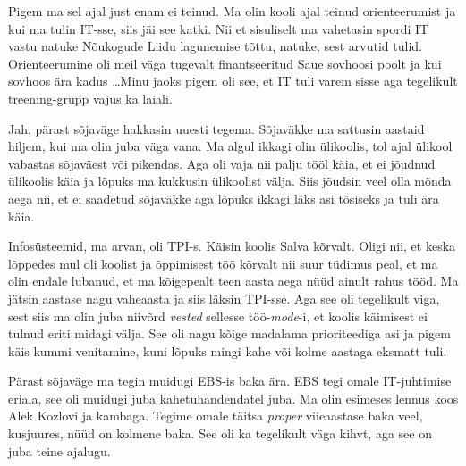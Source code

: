
Pigem ma sel ajal just enam ei teinud. Ma olin kooli ajal teinud 
orienteerumist ja kui ma tulin IT-sse, siis jäi see katki. Nii et sisuliselt ma 
vahetasin  spordi IT vastu natuke Nõukogude Liidu lagunemise tõttu, natuke, 
sest arvutid tulid. Orienteerumine oli meil väga tugevalt finantseeritud Saue 
sovhoosi poolt ja kui sovhoos ära kadus \ldots Minu 
jaoks pigem oli see, et IT tuli varem sisse aga tegelikult treening-grupp vajus 
ka laiali.


Jah, pärast sõjaväge hakkasin uuesti tegema. Sõjaväkke ma sattusin aastaid 
hiljem, kui ma olin juba väga vana.  Ma algul ikkagi olin ülikoolis, tol ajal 
ülikool vabastas sõjaväest või pikendas. Aga oli vaja  nii palju tööl käia, 
et  ei jõudnud ülikoolis käia ja  lõpuks ma kukkusin  ülikoolist välja. Siis 
jõudsin veel olla mõnda aega nii, et ei saadetud sõjaväkke aga lõpuks ikkagi 
läks asi tõsiseks  ja tuli ära käia. 


Infosüsteemid, ma arvan, oli TPI-s. 
Käisin koolis Salva kõrvalt. Oligi nii, et keska lõppedes mul oli koolist ja 
õppimisest töö kõrvalt nii suur tüdimus peal, et ma olin endale lubanud, et ma 
kõigepealt teen aasta aega nüüd ainult rahus tööd. Ma jätsin aastase nagu 
vaheaasta ja siis läksin TPI-sse. Aga see oli tegelikult viga, sest siis ma 
olin juba niivõrd \emph{vested} sellesse töö-\emph{mode}-i, et koolis 
käimisest ei tulnud eriti midagi välja. See oli nagu kõige madalama 
prioriteediga asi ja pigem käis kummi venitamine, kuni lõpuks mingi kahe või 
kolme aastaga eksmatt tuli. 

Pärast sõjaväge ma tegin muidugi EBS-is baka ära. EBS tegi omale IT-juhtimise 
eriala, see oli muidugi juba kahetuhandendatel juba. Ma olin esimeses lennus 
koos Alek Kozlovi ja  kambaga. Tegime omale täitsa  
\emph{proper} viieaastase baka veel, kusjuures, nüüd on kolmene baka. See oli 
ka tegelikult väga kihvt, aga see on juba teine ajalugu. 



